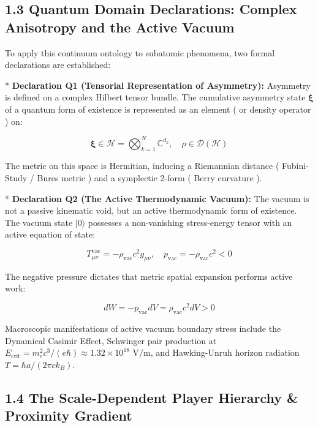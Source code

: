 \documentclass[11pt,a4paper]{article}
\theoremstyle{definition}\newtheorem{definition}{Definition}
\theoremstyle{remark}\newtheorem{remark}{Remark}
\begin{document}
\subsection{1.3 Quantum Domain Declarations: Complex Anisotropy and the Active Vacuum}

To apply this continuum ontology to subatomic phenomena, two formal declarations are established:

* \textbf{Declaration Q1 (Tensorial Representation of Asymmetry):} Asymmetry is defined on a complex Hilbert tensor bundle. The cumulative asymmetry state $\boldsymbol{\xi}$ of a quantum form of existence is represented as an element ( or density operator ) on:


\begin{equation}
\boldsymbol{\xi} \in \mathcal{H} = \bigotimes_{k=1}^N \mathbb{C}^{d_k}, \quad \rho \in \mathcal{D}(\mathcal{H})
\end{equation}


The metric on this space is Hermitian, inducing a Riemannian distance ( Fubini-Study / Bures metric ) and a symplectic 2-form ( Berry curvature ).

* \textbf{Declaration Q2 (The Active Thermodynamic Vacuum):} The vacuum is not a passive kinematic void, but an active thermodynamic form of existence. The vacuum state $|0\rangle$ possesses a non-vanishing stress-energy tensor with an active equation of state:


\begin{equation}
T_{\mu\nu}^{\text{vac}} = -\rho_{\text{vac}} c^2 g_{\mu\nu}, \quad p_{\text{vac}} = -\rho_{\text{vac}} c^2 < 0
\end{equation}


The negative pressure dictates that metric spatial expansion performs active work:


\begin{equation}
dW = -p_{\text{vac}} dV = \rho_{\text{vac}} c^2 dV > 0
\end{equation}


Macroscopic manifestations of active vacuum boundary stress include the Dynamical Casimir Effect, Schwinger pair production at $E_{\text{crit}} = m_e^2 c^3 / (e\hbar) \approx 1.32 \times 10^{18}\text{ V/m}$, and Hawking-Unruh horizon radiation $T = \hbar a / (2\pi c k_B)$.
\subsection{1.4 The Scale-Dependent Player Hierarchy \& Proximity Gradient}
\end{document}
